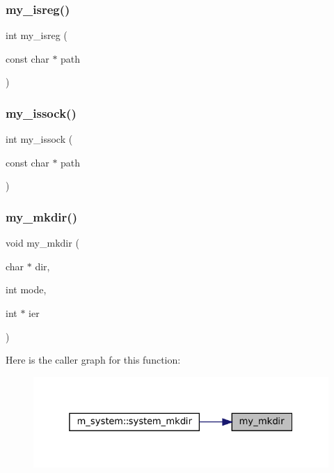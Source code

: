\subsubsection{\texorpdfstring{my\+\_\+isreg()}{my\_isreg()}}
{\footnotesize\ttfamily int my\+\_\+isreg (\begin{DoxyParamCaption}\item[{const char $\ast$}]{path }\end{DoxyParamCaption})}

\mbox{\label{C-M__system_8c_a090bd041de7e5661c0cb3dea61517283}} 
\subsubsection{\texorpdfstring{my\+\_\+issock()}{my\_issock()}}
{\footnotesize\ttfamily int my\+\_\+issock (\begin{DoxyParamCaption}\item[{const char $\ast$}]{path }\end{DoxyParamCaption})}

\mbox{\label{C-M__system_8c_a21b228b36ba6064c95e68c484f92eaf8}} 
\subsubsection{\texorpdfstring{my\+\_\+mkdir()}{my\_mkdir()}}
{\footnotesize\ttfamily void my\+\_\+mkdir (\begin{DoxyParamCaption}\item[{char $\ast$}]{dir,  }\item[{int}]{mode,  }\item[{int $\ast$}]{ier }\end{DoxyParamCaption})}

Here is the caller graph for this function\+:\nopagebreak
\begin{figure}[H]
\begin{center}
\leavevmode
\includegraphics[width=325pt]{C-M__system_8c_a21b228b36ba6064c95e68c484f92eaf8_icgraph}
\end{center}
\end{figure}
\mbox{\label{C-M__system_8c_a91bcacc76b5a33845775f92e9608ac9c}} 
